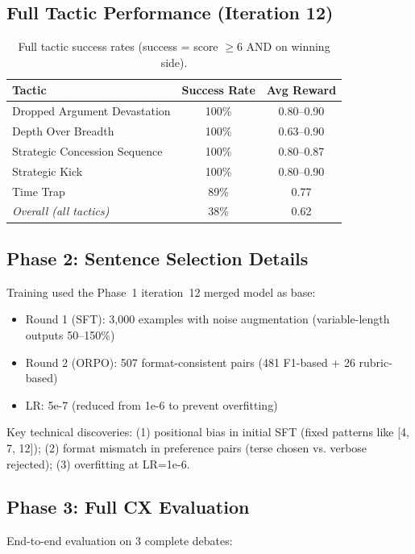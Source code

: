 \subsection{Full Tactic Performance (Iteration 12)}

\begin{table}[h]
\centering
\begin{tabular}{lcc}
\toprule
\textbf{Tactic} & \textbf{Success Rate} & \textbf{Avg Reward} \\
\midrule
Dropped Argument Devastation & 100\% & 0.80--0.90 \\
Depth Over Breadth & 100\% & 0.63--0.90 \\
Strategic Concession Sequence & 100\% & 0.80--0.87 \\
Strategic Kick & 100\% & 0.80--0.90 \\
Time Trap & 89\% & 0.77 \\
\midrule
\textit{Overall (all tactics)} & 38\% & 0.62 \\
\bottomrule
\end{tabular}
\caption{Full tactic success rates (success = score $\geq 6$ AND on winning side).}
\end{table}

\subsection{Phase 2: Sentence Selection Details}

Training used the Phase~1 iteration~12 merged model as base:
\begin{itemize}
    \item Round 1 (SFT): 3,000 examples with noise augmentation (variable-length outputs 50--150\%)
    \item Round 2 (ORPO): 507 format-consistent pairs (481 F1-based + 26 rubric-based)
    \item LR: 5e-7 (reduced from 1e-6 to prevent overfitting)
\end{itemize}

Key technical discoveries: (1) positional bias in initial SFT (fixed patterns like [4, 7, 12]); (2) format mismatch in preference pairs (terse chosen vs. verbose rejected); (3) overfitting at LR=1e-6.

\subsection{Phase 3: Full CX Evaluation}

End-to-end evaluation on 3 complete debates:

